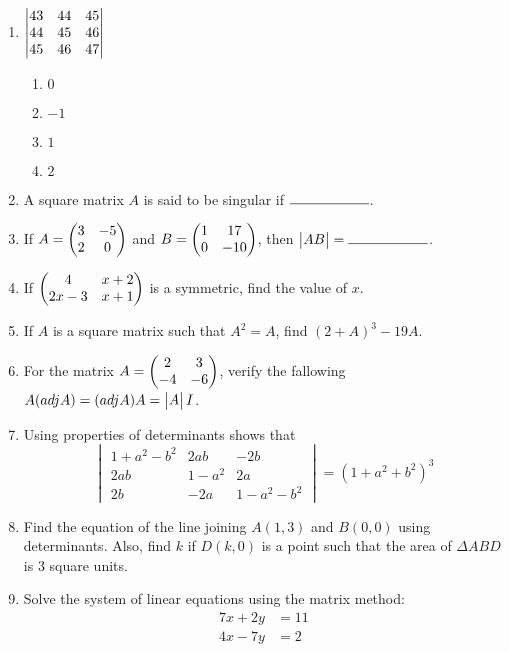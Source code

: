 \documentclass{article}
\begin{document}
\begin{enumerate}
    \item $\begin{vmatrix}43 & 44 & 45 \\ 44 & 45 & 46 \\ 45 & 46 & 47\end{vmatrix}$
    \begin{enumerate}
        \item $0$
        \item $-1$
        \item $1$
        \item $2$
    \end{enumerate}

    \item A square matrix $A$ is said to be singular if $\rule{2cm}{0.15mm}$.
    
    \item If $A =\begin{pmatrix}3 & -5 \\ 2 & 0\end{pmatrix}$ and $B = \begin{pmatrix}1 & 17 \\ 0 & -10\end{pmatrix}$, then $\mydet{AB} = \rule{2cm}{0.15mm}$.
    
    \item If $\begin{pmatrix}4 & x+2 \\ 2x-3 & x+1\end{pmatrix}$ is a symmetric, find the value of $x$.
    
    \item If $A$ is a square matrix such that $A^2 = A$, find $(2+A)^3 - 19A$.

    \item For the matrix $A = \begin{pmatrix}2 & 3 \\ -4 & -6\end{pmatrix}$, verify the fallowing $A(adj A) = (adj A)A = \begin{vmatrix}A\end{vmatrix}I$.

    \item Using properties of determinants shows that
	    \[
    		\begin{vmatrix}
        		1 + a^2 - b^2 & 2ab & -2b \\
        		2ab & 1 - a^2 & 2a \\
        		2b & -2a & 1 - a^2 - b^2
    		\end{vmatrix} = (1 + a^2 + b^2)^3
	    \]

    \item Find the equation of the line joining $A(1, 3)$ and $B(0, 0)$ using determinants. Also, find $k$ if $D(k, 0)$ is a point such that the area of $\Delta{ABD}$ is $3$ square units.
    
    \item Solve the system of linear equations using the matrix method:
    \begin{align*}
        7x + 2y &= 11 \\
        4x - 7y &= 2
    \end{align*}
    

\end{enumerate}
\end{document}
